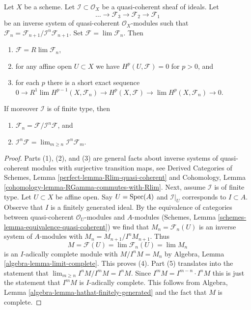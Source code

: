 \begin{lemma}
\label{lemma-properties-system}
Let $X$ be a scheme. Let $\mathcal{I} \subset \mathcal{O}_X$
be a quasi-coherent sheaf of ideals. Let
$$
\ldots \to \mathcal{F}_3 \to \mathcal{F}_2 \to \mathcal{F}_1
$$
be an inverse system of quasi-coherent $\mathcal{O}_X$-modules
such that
$\mathcal{F}_n = \mathcal{F}_{n + 1}/\mathcal{I}^n\mathcal{F}_{n + 1}$.
Set $\mathcal{F} = \lim \mathcal{F}_n$. Then
\begin{enumerate}
\item $\mathcal{F} = R\lim \mathcal{F}_n$,
\item for any affine open $U \subset X$ we have
$H^p(U, \mathcal{F}) = 0$ for $p > 0$, and
\item for each $p$ there is a short exact sequence
$0 \to R^1\lim H^{p - 1}(X, \mathcal{F}_n) \to
H^p(X, \mathcal{F}) \to \lim H^p(X, \mathcal{F}_n) \to 0$.
\end{enumerate}
If moreover $\mathcal{I}$ is of finite type, then
\begin{enumerate}
\item[(4)]
$\mathcal{F}_n = \mathcal{F}/\mathcal{I}^n\mathcal{F}$, and
\item[(5)]
$\mathcal{I}^n \mathcal{F} = \lim_{m \geq n} \mathcal{I}^n\mathcal{F}_m$.
\end{enumerate}
\end{lemma}

\begin{proof}
Parts (1), (2), and (3) are general facts about inverse systems of
quasi-coherent modules with surjective transition maps, see
Derived Categories of Schemes, Lemma \ref{perfect-lemma-Rlim-quasi-coherent}
and Cohomology, Lemma \ref{cohomology-lemma-RGamma-commutes-with-Rlim}.
Next, assume $\mathcal{I}$ is of finite type.
Let $U \subset X$ be affine open. Say $U = \mathop{\mathrm{Spec}}(A)$ and $\mathcal{I}|_U$
corresponds to $I \subset A$. Observe that $I$ is a finitely generated ideal.
By the equivalence of categories between quasi-coherent $\mathcal{O}_U$-modules
and $A$-modules (Schemes, Lemma \ref{schemes-lemma-equivalence-quasi-coherent})
we find that $M_n = \mathcal{F}_n(U)$ is an inverse system
of $A$-modules with $M_n = M_{n + 1}/I^nM_{n + 1}$. Thus
$$
M = \mathcal{F}(U) = \lim \mathcal{F}_n(U) = \lim M_n
$$
is an $I$-adically complete module with $M/I^nM = M_n$ by
Algebra, Lemma \ref{algebra-lemma-limit-complete}. This proves (4).
Part (5) translates into the statement that
$\lim_{m \geq n} I^nM/I^mM = I^nM$.
Since $I^mM = I^{m - n} \cdot I^nM$ this is just the statement that
$I^mM$ is $I$-adically complete. This follows from
Algebra, Lemma \ref{algebra-lemma-hathat-finitely-generated}
and the fact that $M$ is complete.
\end{proof}





